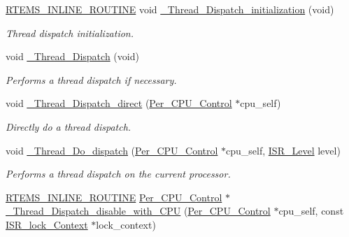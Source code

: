 \begin{DoxyCompactItemize}
\mbox{\hyperlink{group__RTEMSScoreBaseDefs_gac216239df231d5dbd15e3520b0b9313f}{R\+T\+E\+M\+S\+\_\+\+I\+N\+L\+I\+N\+E\+\_\+\+R\+O\+U\+T\+I\+NE}} void \mbox{\hyperlink{group__RTEMSScoreThread_gae1b097ce535f591840d891f691812759}{\+\_\+\+Thread\+\_\+\+Dispatch\+\_\+initialization}} (void)
\begin{DoxyCompactList}\small\item\em Thread dispatch initialization. \end{DoxyCompactList}\item 
void \mbox{\hyperlink{group__RTEMSScoreThread_ga14e949c0f400cda43b1e7547e50b088d}{\+\_\+\+Thread\+\_\+\+Dispatch}} (void)
\begin{DoxyCompactList}\small\item\em Performs a thread dispatch if necessary. \end{DoxyCompactList}\item 
void \mbox{\hyperlink{group__RTEMSScoreThread_gab4251559fe6a0c06762de333bca275f5}{\+\_\+\+Thread\+\_\+\+Dispatch\+\_\+direct}} (\mbox{\hyperlink{structPer__CPU__Control}{Per\+\_\+\+C\+P\+U\+\_\+\+Control}} $\ast$cpu\+\_\+self)
\begin{DoxyCompactList}\small\item\em Directly do a thread dispatch. \end{DoxyCompactList}\item 
void \mbox{\hyperlink{group__RTEMSScoreThread_gaf0ea5fef985f18cd60d85d9cedab4c6c}{\+\_\+\+Thread\+\_\+\+Do\+\_\+dispatch}} (\mbox{\hyperlink{structPer__CPU__Control}{Per\+\_\+\+C\+P\+U\+\_\+\+Control}} $\ast$cpu\+\_\+self, \mbox{\hyperlink{group__RTEMSScoreISR_gad1af728587ebcefec5b5cf94fc7909b9}{I\+S\+R\+\_\+\+Level}} level)
\begin{DoxyCompactList}\small\item\em Performs a thread dispatch on the current processor. \end{DoxyCompactList}\item 
\mbox{\hyperlink{group__RTEMSScoreBaseDefs_gac216239df231d5dbd15e3520b0b9313f}{R\+T\+E\+M\+S\+\_\+\+I\+N\+L\+I\+N\+E\+\_\+\+R\+O\+U\+T\+I\+NE}} \mbox{\hyperlink{structPer__CPU__Control}{Per\+\_\+\+C\+P\+U\+\_\+\+Control}} $\ast$ \mbox{\hyperlink{group__RTEMSScoreThread_ga80a71da4ea096f7ea92781a872b955ae}{\+\_\+\+Thread\+\_\+\+Dispatch\+\_\+disable\+\_\+with\+\_\+\+C\+PU}} (\mbox{\hyperlink{structPer__CPU__Control}{Per\+\_\+\+C\+P\+U\+\_\+\+Control}} $\ast$cpu\+\_\+self, const \mbox{\hyperlink{structISR__lock__Context}{I\+S\+R\+\_\+lock\+\_\+\+Context}} $\ast$lock\+\_\+context)

\end{DoxyCompactItemize}
